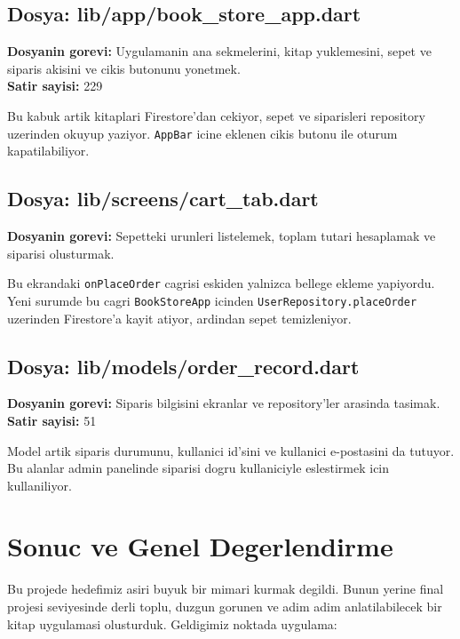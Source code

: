 \documentclass[12pt,a4paper]{article}
\begin{document}
\subsection{Dosya: lib/app/book\_store\_app.dart}

\textbf{Dosyanin gorevi:} Uygulamanin ana sekmelerini, kitap yuklemesini, sepet ve siparis akisini ve cikis butonunu yonetmek.\\
\textbf{Satir sayisi:} 229



Bu kabuk artik kitaplari Firestore'dan cekiyor, sepet ve siparisleri repository uzerinden okuyup yaziyor. \verb|AppBar| icine eklenen cikis butonu ile oturum kapatilabiliyor.

\subsection{Dosya: lib/screens/cart\_tab.dart}

\textbf{Dosyanin gorevi:} Sepetteki urunleri listelemek, toplam tutari hesaplamak ve siparisi olusturmak.

Bu ekrandaki \verb|onPlaceOrder| cagrisi eskiden yalnizca bellege ekleme yapiyordu. Yeni surumde bu cagri \verb|BookStoreApp| icinden \verb|UserRepository.placeOrder| uzerinden Firestore'a kayit atiyor, ardindan sepet temizleniyor.

\subsection{Dosya: lib/models/order\_record.dart}

\textbf{Dosyanin gorevi:} Siparis bilgisini ekranlar ve repository'ler arasinda tasimak.\\
\textbf{Satir sayisi:} 51



Model artik siparis durumunu, kullanici id'sini ve kullanici e-postasini da tutuyor. Bu alanlar admin panelinde siparisi dogru kullaniciyle eslestirmek icin kullaniliyor.

\section{Sonuc ve Genel Degerlendirme}

Bu projede hedefimiz asiri buyuk bir mimari kurmak degildi. Bunun yerine final projesi seviyesinde derli toplu, duzgun gorunen ve adim adim anlatilabilecek bir kitap uygulamasi olusturduk. Geldigimiz noktada uygulama:
\end{document}
